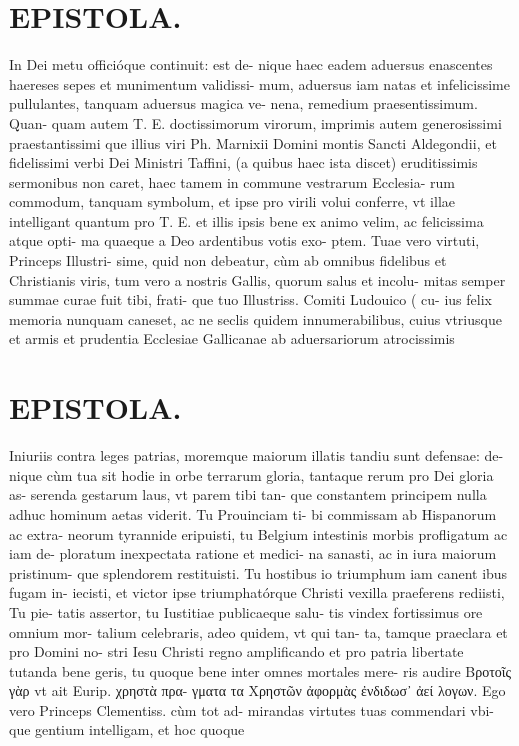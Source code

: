 \documentclass{article}
\begin{document}
\begin{pages}
\section*{EPISTOLA. }\pstart In Dei metu officióque continuit: est de- nique haec eadem aduersus enascentes haereses sepes et munimentum validissi- mum, aduersus iam natas et infelicissime pullulantes, tanquam aduersus magica ve- nena, remedium praesentissimum. Quan- quam autem T. E. doctissimorum virorum, imprimis autem generosissimi praestantissimi que illius viri Ph. Marnixii Domini montis Sancti Aldegondii, et fidelissimi verbi Dei Ministri Taffini, (a quibus haec ista discet) eruditissimis sermonibus non caret, haec tamem in commune vestrarum Ecclesia- rum commodum, tanquam symbolum, et ipse pro virili volui conferre, vt illae intelligant quantum pro T. E. et illis ipsis bene ex animo velim, ac felicissima atque opti- ma quaeque a Deo ardentibus votis exo- ptem. Tuae vero virtuti, Princeps Illustri- sime, quid non debeatur, cùm ab omnibus fidelibus et Christianis viris, tum vero a nostris Gallis, quorum salus et incolu- mitas semper summae curae fuit tibi, frati- que tuo Illustriss. Comiti Ludouico ( cu- ius felix memoria nunquam caneset, ac ne seclis quidem innumerabilibus, cuius vtriusque et armis et prudentia Ecclesiae Gallicanae ab aduersariorum atrocissimis  \pend
\section*{EPISTOLA. }\pstart Iniuriis contra leges patrias, moremque maiorum illatis tandiu sunt defensae: de- nique cùm tua sit hodie in orbe terrarum gloria, tantaque rerum pro Dei gloria as- serenda gestarum laus, vt parem tibi tan- que constantem principem nulla adhuc hominum aetas viderit. Tu Prouinciam ti- bi commissam ab Hispanorum ac extra- neorum tyrannide eripuisti, tu Belgium intestinis morbis profligatum ac iam de- ploratum inexpectata ratione et medici- na sanasti, ac in iura maiorum pristinum- que splendorem restituisti. Tu hostibus io triumphum iam canent ibus fugam in- iecisti, et victor ipse triumphatórque Christi vexilla praeferens rediisti, Tu pie- tatis assertor, tu Iustitiae publicaeque salu- tis vindex fortissimus ore omnium mor- talium celebraris, adeo quidem, vt qui tan- ta, tamque praeclara et pro Domini no- stri Iesu Christi regno amplificando et pro patria libertate tutanda bene geris, tu quoque  bene inter omnes mortales mere- ris audire Βροτοῖς γὰρ vt ait Eurip. χρηστὰ πρα- γματα τα Χρηστῶν ἀφορμὰς ἐνδιδωσ᾽ ἀεί λογων. Ego vero Princeps Clementiss. cùm tot ad- mirandas virtutes tuas commendari vbi- que gentium intelligam, et hoc quoque  \pend

\end{pages}
\end{document}

